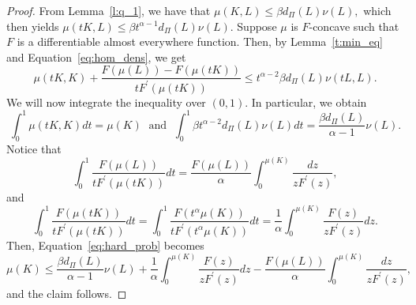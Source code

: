 \documentclass[11pt]{amsart}
\theoremstyle{definition}
\theoremstyle{remark}
\numberwithin{equation}{section}
\begin{document}
\begin{proof}
From Lemma~\ref{l:q_1}, we have that
$\mu(K,L) \leq \beta d_{\Pi}(L)\nu(L),$
which then yields
$\mu(tK,L) \leq \beta t^{\alpha-1}d_{\Pi}(L)\nu(L).$
Suppose $\mu$ is $F$-concave such that $F$ is a differentiable almost everywhere function. Then, by Lemma~\ref{t:min_eq} and Equation~\ref{eq:hom_dens}, we get
\begin{equation}
\mu(tK, K)+\frac{F(\mu(L))-F(\mu(tK))}{tF^{\prime}(\mu(tK))}\leq t^{\alpha -2}\beta d_{\Pi} (L)\nu(tL,L).
\label{eq:hard_prob}
\end{equation}
We will now integrate the inequality over $(0,1)$. In particular, we obtain 
$$
\int_{0}^{1}\mu(tK, K)dt = \mu(K) \; \text{ and } \;
\int_0^1 \beta t^{\alpha-2}d_{\Pi}(L)\nu(L)dt=\frac{\beta d_{\Pi}(L)}{\alpha-1}\nu(L).
$$
Notice that
\begin{equation*}
\int_{0}^{1}\frac{F(\mu(L))}{tF^{\prime}(\mu(tK))}dt = \frac{F(\mu(L))}{\alpha} \int_{0}^{\mu(K)}\frac{dz}{zF^\prime(z)},
\end{equation*}
and
\begin{equation*}
\int_{0}^{1}\frac{F(\mu(tK))}{tF^{\prime}(\mu(tK))}dt = \int_{0}^{1}\frac{F(t^{\alpha}\mu(K))}{tF^{\prime}(t^{\alpha}\mu(K))}dt
=\frac{1}{\alpha}\int_{0}^{\mu(K)} \frac{F(z)}{zF^\prime(z)}dz.
\end{equation*} 
Then, Equation~\ref{eq:hard_prob} becomes
$$
\mu(K) \leq \frac{\beta d_{\Pi}(L)}{\alpha-1}\nu(L) + \frac{1}{\alpha}\int_{0}^{\mu(K)} \frac{F(z)}{zF^\prime(z)}dz - \frac{F(\mu(L))}{\alpha} \int_{0}^{\mu(K)}\frac{dz}{zF^\prime(z)},
$$
and the claim follows.
\end{proof}
\end{document}
